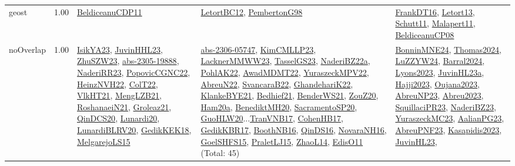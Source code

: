 {\begin{longtable}{p{3cm}r>{\raggedright\arraybackslash}p{6cm}>{\raggedright\arraybackslash}p{6cm}>{\raggedright\arraybackslash}p{8cm}}
\index{geost}\index{Constraints!geost}geost &  1.00 & \hyperref[detail:BeldiceanuCDP11]{BeldiceanuCDP11} & \hyperref[detail:LetortBC12]{LetortBC12}, \hyperref[detail:PembertonG98]{PembertonG98} & \hyperref[detail:FrankDT16]{FrankDT16}, \hyperref[detail:Letort13]{Letort13}, \hyperref[detail:Schutt11]{Schutt11}, \hyperref[detail:Malapert11]{Malapert11}, \hyperref[detail:BeldiceanuCP08]{BeldiceanuCP08}\\
\index{noOverlap}\index{Constraints!noOverlap}noOverlap &  1.00 & \hyperref[detail:IsikYA23]{IsikYA23}, \hyperref[detail:JuvinHHL23]{JuvinHHL23}, \hyperref[detail:ZhuSZW23]{ZhuSZW23}, \hyperref[detail:abs-2305-19888]{abs-2305-19888}, \hyperref[detail:NaderiRR23]{NaderiRR23}, \hyperref[detail:PopovicCGNC22]{PopovicCGNC22}, \hyperref[detail:HeinzNVH22]{HeinzNVH22}, \hyperref[detail:ColT22]{ColT22}, \hyperref[detail:VlkHT21]{VlkHT21}, \hyperref[detail:MengLZB21]{MengLZB21}, \hyperref[detail:RoshanaeiN21]{RoshanaeiN21}, \hyperref[detail:Groleaz21]{Groleaz21}, \hyperref[detail:QinDCS20]{QinDCS20}, \hyperref[detail:Lunardi20]{Lunardi20}, \hyperref[detail:LunardiBLRV20]{LunardiBLRV20}, \hyperref[detail:GedikKEK18]{GedikKEK18}, \hyperref[detail:MelgarejoLS15]{MelgarejoLS15} & \hyperref[detail:abs-2306-05747]{abs-2306-05747}, \hyperref[detail:KimCMLLP23]{KimCMLLP23}, \hyperref[detail:LacknerMMWW23]{LacknerMMWW23}, \hyperref[detail:TasselGS23]{TasselGS23}, \hyperref[detail:NaderiBZ22a]{NaderiBZ22a}, \hyperref[detail:PohlAK22]{PohlAK22}, \hyperref[detail:AwadMDMT22]{AwadMDMT22}, \hyperref[detail:YuraszeckMPV22]{YuraszeckMPV22}, \hyperref[detail:AbreuN22]{AbreuN22}, \hyperref[detail:SvancaraB22]{SvancaraB22}, \hyperref[detail:GhandehariK22]{GhandehariK22}, \hyperref[detail:KlankeBYE21]{KlankeBYE21}, \hyperref[detail:Bedhief21]{Bedhief21}, \hyperref[detail:BenderWS21]{BenderWS21}, \hyperref[detail:ZouZ20]{ZouZ20}, \hyperref[detail:Ham20a]{Ham20a}, \hyperref[detail:BenediktMH20]{BenediktMH20}, \hyperref[detail:SacramentoSP20]{SacramentoSP20}, \hyperref[detail:GuoHLW20]{GuoHLW20}...\hyperref[detail:TranVNB17]{TranVNB17}, \hyperref[detail:CohenHB17]{CohenHB17}, \hyperref[detail:GedikKBR17]{GedikKBR17}, \hyperref[detail:BoothNB16]{BoothNB16}, \hyperref[detail:QinDS16]{QinDS16}, \hyperref[detail:NovaraNH16]{NovaraNH16}, \hyperref[detail:GoelSHFS15]{GoelSHFS15}, \hyperref[detail:PraletLJ15]{PraletLJ15}, \hyperref[detail:ZhaoL14]{ZhaoL14}, \hyperref[detail:EdisO11]{EdisO11} (Total: 45) & \hyperref[detail:BonninMNE24]{BonninMNE24}, \hyperref[detail:Thomas2024]{Thomas2024}, \hyperref[detail:LuZZYW24]{LuZZYW24}, \hyperref[detail:Barral2024]{Barral2024}, \hyperref[detail:Lyons2023]{Lyons2023}, \hyperref[detail:JuvinHL23a]{JuvinHL23a}, \hyperref[detail:Hajji2023]{Hajji2023}, \hyperref[detail:Oujana2023]{Oujana2023}, \hyperref[detail:AbreuNP23]{AbreuNP23}, \hyperref[detail:Abreu2023]{Abreu2023}, \hyperref[detail:SquillaciPR23]{SquillaciPR23}, \hyperref[detail:NaderiBZ23]{NaderiBZ23}, \hyperref[detail:YuraszeckMC23]{YuraszeckMC23}, \hyperref[detail:AalianPG23]{AalianPG23}, \hyperref[detail:AbreuPNF23]{AbreuPNF23}, \hyperref[detail:Kasapidis2023]{Kasapidis2023}, \hyperref[detail:JuvinHL23]{JuvinHL23}, 
\end{longtable}}
